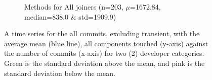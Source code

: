 \begin{figure}
\begin{subfigure}[b]{0.45\textwidth}
    \caption{Methods for All joiners (n=203, $\mu$=1672.84, median=838.0 \& std=1909.9)}
    \label{subfig:sections/results/methods/time_series_components_touched_methods_all_joiners_commits_500_pdf}
  \end{subfigure}
\caption[Time Series for all compenents unit:commits category:2 commits:all]{A time series for the all commits, excluding transient, with the average mean (blue line), all components touched (y-axis) against the number of commits (x-axis) for two (2) developer categories. Green is the standard deviation above the mean, and pink is the standard deviation below the mean.} 
    \label{fig:0_codebase_graph_latex_repository_graph_component_time_series_time_series_components_touchedmethods0_500}
\end{figure}
\clearpage 
\newpage 
